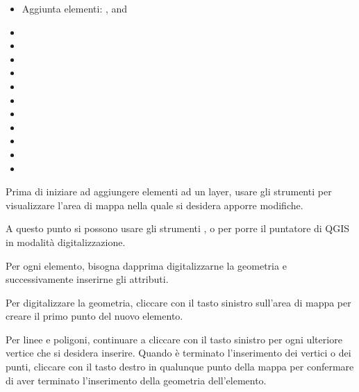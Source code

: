 \begin{itemize}
\item Aggiunta elementi: ,
   and
\item {}
\item {}
\item {}
\item {}
\item {}
\item {}
\item {}
\item {}
\item {}
\item {}
\item {}
\end{itemize}


Prima di iniziare ad aggiungere elementi ad un layer, usare gli strumenti
  
per visualizzare l'area di mappa nella quale si desidera apporre modifiche.

A questo punto si possono usare gli strumenti ,
 o
 per porre il puntatore
di QGIS in modalità digitalizzazione.

Per ogni elemento, bisogna dapprima digitalizzarne la geometria e
successivamente inserirne gli attributi.

Per digitalizzare la geometria, cliccare con il tasto sinistro sull'area di
mappa per creare il primo punto del nuovo elemento.

Per linee e poligoni, continuare a cliccare con il tasto sinistro per ogni
ulteriore vertice che si desidera inserire. Quando è terminato l'inserimento
dei vertici o dei punti, cliccare con il tasto destro in qualunque punto della
mappa per confermare di aver terminato l'inserimento della geometria
dell'elemento.

